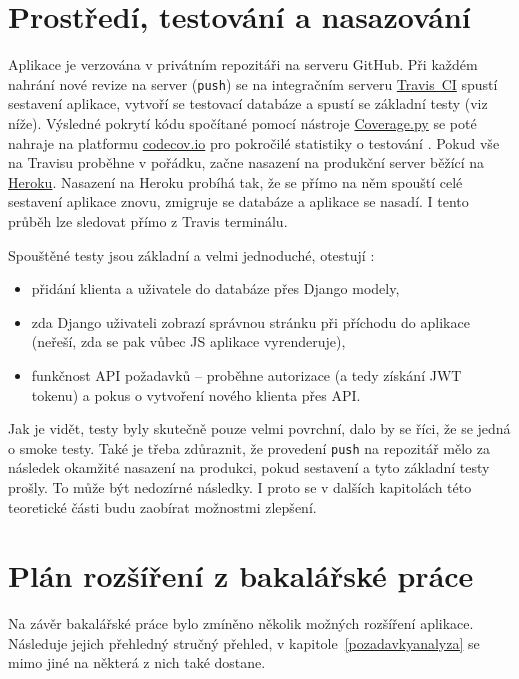 \section{Prostředí, testování a nasazování}

Aplikace \cite{bp} je verzována v privátním repozitáři na serveru GitHub. Při každém nahrání nové revize na server (\verb|push|) se na integračním serveru \href{https://travis-ci.com/}{Travis~CI} spustí sestavení aplikace, vytvoří se testovací databáze a spustí se základní testy (viz níže). Výsledné pokrytí kódu spočítané pomocí nástroje \href{https://coverage.readthedocs.io/}{Coverage.py} se poté nahraje na platformu \href{https://codecov.io/}{codecov.io} pro pokročilé statistiky o testování \cite{codecov}. Pokud vše na Travisu proběhne v pořádku, začne nasazení na produkční server běžící na \href{https://www.heroku.com/}{Heroku}. Nasazení na Heroku probíhá tak, že se přímo na něm spouští celé sestavení aplikace znovu, zmigruje se databáze a aplikace se nasadí. I tento průběh lze sledovat přímo z Travis terminálu.

Spouštěné testy jsou základní a velmi jednoduché, otestují \cite{bp}:
\begin{itemize}
    \item přidání klienta a uživatele do databáze přes Django modely,
    \item zda Django uživateli zobrazí správnou stránku při příchodu do aplikace (neřeší, zda se pak vůbec JS aplikace vyrenderuje),
    \item funkčnost API požadavků -- proběhne autorizace (a tedy získání JWT tokenu) a pokus o vytvoření nového klienta přes API.
\end{itemize}

Jak je vidět, testy byly skutečně pouze velmi povrchní, dalo by se říci, že se jedná o smoke testy. Také je třeba zdůraznit, že provedení \verb|push| na repozitář mělo za následek okamžité nasazení na produkci, pokud sestavení a tyto základní testy prošly. To může být nedozírné následky. I proto se v dalších kapitolách této teoretické části budu zaobírat možnostmi zlepšení.

\section{Plán rozšíření z bakalářské práce}

Na závěr bakalářské práce \cite{bp} bylo zmíněno několik možných rozšíření aplikace. Následuje jejich přehledný stručný přehled, v kapitole~\ref{pozadavkyanalyza} se mimo jiné na některá z nich také dostane.

